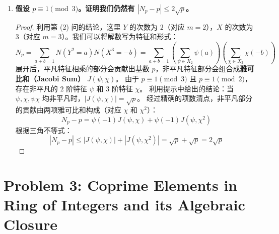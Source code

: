 \documentclass[]{article}
\begin{document}
\begin{enumerate}[label=(\\arabic*)]
		\begin{proof}
			由于 $m \mid (p-1)$，$\mathbb{F}_p^\times$ 的乘法群是循环群，其具有一个唯一的阶为 $m$ 的子群。
			\begin{itemize}
				\item 若 $a = 0$，根据定义，只有当 $\chi = \chi_0$（平凡特征）时 $\chi(0)=1$，其余非平凡特征 $\chi(0)=0$。因此右侧和为 $1$。而方程 $X^m=0$ 确实只有 $X=0$ 这 $1$ 个解。
				\item 若 $a \neq 0$ 且 $a$ 是一个 $m$ 次幂（即存在 $x$ 使得 $x^m = a$）：对于所有满足 $\chi^m = \chi_0$ 的特征 $\chi$，都有 $\chi(a) = \chi(x^m) = \chi(x)^m = 1$。因为 $X_m$ 的大小为 $m$，所以右侧的和为 $\sum_{\chi \in X_m} 1 = m$。而方程 $X^m = a$ 的解数也恰好是 $m$。
				\item 若 $a \neq 0$ 且 $a$ 不是一个 $m$ 次幂：由有限群特征的正交关系，在子群上求和 $\sum_{\chi \in X_m} \chi(a) = 0$。同时方程 $X^m = a$ 无解，解数为 $0$。
			\end{itemize}
			综上所述，等式在所有情况下均成立。
		\end{proof}
		
		\item \textbf{假设 $p \equiv 1 \pmod 3$。证明我们仍然有 $|N_p - p| \le 2\sqrt{p}$。}
		
		\begin{proof}
			利用第 (2) 问的结论，这里 $Y$ 的次数为 $2$（对应 $m=2$），$X$ 的次数为 $3$（对应 $m=3$）。我们可以将解数写为特征和形式：
			\[ N_p = \sum_{a+b=1} N(Y^2 = a) N(X^3 = -b) = \sum_{a+b=1} \left( \sum_{\psi \in X_2} \psi(a) \right) \left( \sum_{\chi \in X_3} \chi(-b) \right) \]
			展开后，平凡特征相乘的部分会贡献出基数 $p$，非平凡特征部分会组合成\textbf{雅可比和（Jacobi Sum）} $J(\psi, \chi)$。
			由于 $p \equiv 1 \pmod 3$ 且 $p \equiv 1 \pmod 2$，存在非平凡的 $2$ 阶特征 $\psi$ 和 $3$ 阶特征 $\chi$。
			利用提示中给出的结论：当 $\psi, \chi, \psi\chi$ 均非平凡时，$|J(\psi, \chi)| = \sqrt{p}$。
			经过精确的项数清点，非平凡部分的贡献由两项雅可比和构成（对应 $\chi$ 和 $\chi^2$）：
			\[ N_p - p = \psi(-1)J(\psi, \chi) + \psi(-1)J(\psi, \chi^2) \]
			根据三角不等式：
			\[ |N_p - p| \le |J(\psi, \chi)| + |J(\psi, \chi^2)| = \sqrt{p} + \sqrt{p} = 2\sqrt{p} \]
		\end{proof}
	\end{enumerate}
	
	\pagebreak
	
	\section*{Problem 3: Coprime Elements in Ring of Integers and its Algebraic Closure}
	
\end{document}
